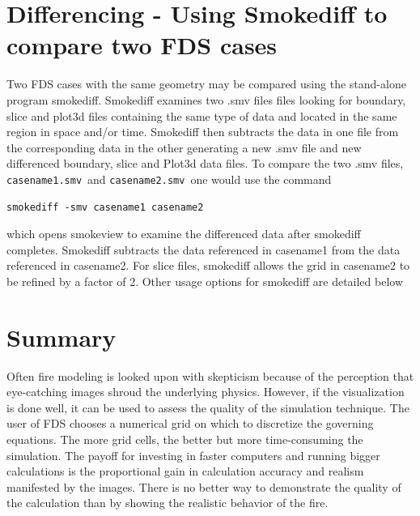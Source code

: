 \documentclass[11pt,twoside]{book}
\begin{document}
\chapter{Differencing - Using Smokediff to compare two FDS cases}

Two FDS cases with the same geometry may be compared using the stand-alone
program smokediff.  Smokediff examines two .smv files files looking for boundary, slice and plot3d files containing the same type of data and located in the same region in space and/or time.  Smokediff then subtracts the data in one file from the corresponding data in the other generating a new .smv file and new differenced boundary, slice and Plot3d data files.  To compare the two .smv files, {\tt casename1.smv}\ and {\tt casename2.smv}\ one would use the command

\begin{verbatim}
smokediff -smv casename1 casename2
\end{verbatim}

\noindent which opens smokeview to examine the differenced data after smokediff completes.  Smokediff subtracts the data referenced in casename1 from the data referenced in casename2.   For slice files, smokediff allows the grid in casename2 to be refined by a factor of 2.  Other usage options for smokediff are detailed below

{
\scriptsize

}


\chapter{Summary}
Often fire modeling is looked upon with skepticism because of the
perception that eye-catching images shroud the underlying physics.
However, if the visualization is done well, it can be used to
assess the quality of the simulation technique. The user of FDS
chooses a numerical grid on which to discretize the governing
equations. The more grid cells, the better but more time-consuming
the simulation. The payoff for investing in faster computers and
running bigger calculations is the proportional gain in calculation accuracy and realism
manifested by the images. There is no better way to demonstrate
the quality of the calculation than by showing the realistic
behavior of the fire.
\end{document}
